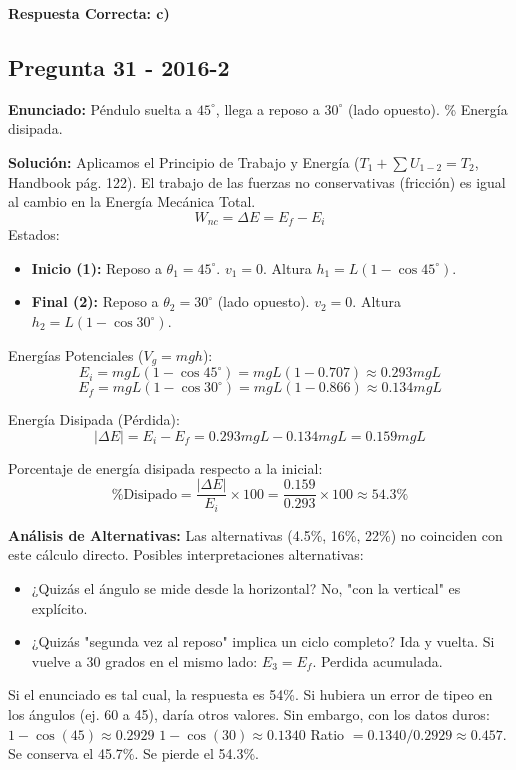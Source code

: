 \documentclass{article}
\begin{document}
\noindent{}

\textbf{Respuesta Correcta: c)}

\vspace{0.5cm}

\subsection*{Pregunta 31 - 2016-2}
\textbf{Enunciado:} Péndulo suelta a $45^\circ$, llega a reposo a $30^\circ$ (lado opuesto). \% Energía disipada.

\textbf{Solución:}
Aplicamos el Principio de Trabajo y Energía ($T_1 + \sum U_{1-2} = T_2$, Handbook pág. 122).
El trabajo de las fuerzas no conservativas (fricción) es igual al cambio en la Energía Mecánica Total.
$$ W_{nc} = \Delta E = E_f - E_i $$
Estados:
\begin{itemize}
    \item \textbf{Inicio (1):} Reposo a $\theta_1 = 45^\circ$. $v_1 = 0$. Altura $h_1 = L(1 - \cos 45^\circ)$.
    \item \textbf{Final (2):} Reposo a $\theta_2 = 30^\circ$ (lado opuesto). $v_2 = 0$. Altura $h_2 = L(1 - \cos 30^\circ)$.
\end{itemize}
Energías Potenciales ($V_g = mgh$):
$$ E_i = mgL(1 - \cos 45^\circ) = mgL(1 - 0.707) \approx 0.293 mgL $$
$$ E_f = mgL(1 - \cos 30^\circ) = mgL(1 - 0.866) \approx 0.134 mgL $$

Energía Disipada (Pérdida):
$$ |\Delta E| = E_i - E_f = 0.293mgL - 0.134mgL = 0.159 mgL $$

Porcentaje de energía disipada respecto a la inicial:
$$ \% \text{Disipado} = \frac{|\Delta E|}{E_i} \times 100 = \frac{0.159}{0.293} \times 100 \approx 54.3\% $$

\textbf{Análisis de Alternativas:}
Las alternativas (4.5\%, 16\%, 22\%) no coinciden con este cálculo directo.
Posibles interpretaciones alternativas:
\begin{itemize}
    \item ¿Quizás el ángulo se mide desde la horizontal? No, "con la vertical" es explícito.
    \item ¿Quizás "segunda vez al reposo" implica un ciclo completo? Ida y vuelta. Si vuelve a 30 grados en el mismo lado:
    $E_3 = E_f$. Perdida acumulada.
\end{itemize}
Si el enunciado es tal cual, la respuesta es 54\%. Si hubiera un error de tipeo en los ángulos (ej. 60 a 45), daría otros valores.
Sin embargo, con los datos duros:
$1 - \cos(45) \approx 0.2929$
$1 - \cos(30) \approx 0.1340$
Ratio $= 0.1340 / 0.2929 \approx 0.457$. Se conserva el 45.7\%. Se pierde el 54.3\%.
\end{document}
